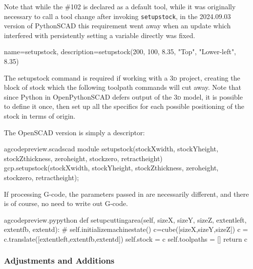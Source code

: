 \documentclass{ltxdoc}
\begin{document}
Note that while the \#102 is declared as a default tool, while it was originally necessary to call a tool change after invoking \verb|setupstock|, in the 2024.09.03 version of PythonSCAD this requirement went away when an update which interfered with persistently setting a variable directly was fixed.


{
    name=setupstock, 
    description={setupstock(200, 100, 8.35, "Top", "Lower-left", 8.35)}
}

\noindent The \gls{setupstock} command is required if working with a \textsc{3d} project, creating the block of stock which the following toolpath commands will cut away. Note that since Python in OpenPythonSCAD defers output of the \textsc{3d} model, it is possible to define it once, then set up all the specifics for each possible positioning of the stock in terms of origin.

The OpenSCAD version is simply a descriptor:

\lstset{firstnumber=\thegcpscad}
\begin{writecode}{a}{gcodepreview.scad}{scad}
module setupstock(stockXwidth, stockYheight, stockZthickness, zeroheight, stockzero, retractheight) {
    gcp.setupstock(stockXwidth, stockYheight, stockZthickness, zeroheight, stockzero, retractheight);
}

\end{writecode}
\addtocounter{gcpscad}{4}

If processing G-code, the parameters passed in are necessarily different, and there is of course, no need to write out G-code. 

\lstset{firstnumber=\thegcpy}
\begin{writecode}{a}{gcodepreview.py}{python}
    def setupcuttingarea(self, sizeX, sizeY, sizeZ, extentleft, extentfb, extentd):
#        self.initializemachinestate() 
        c=cube([sizeX,sizeY,sizeZ])
        c = c.translate([extentleft,extentfb,extentd])
        self.stock = c
        self.toolpaths = []
        return c
        
\end{writecode}
\addtocounter{gcpy}{8}


\subsubsection{Adjustments and Additions}
\end{document}
